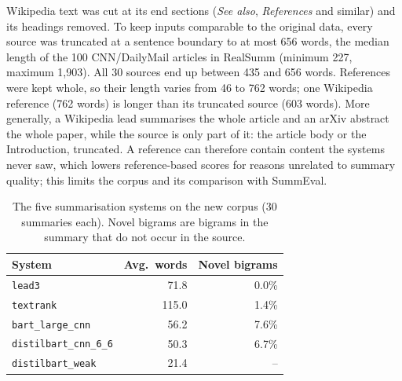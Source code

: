 \documentclass[11pt]{article}
\begin{document}
Wikipedia text was cut at its end sections (\emph{See also}, \emph{References} and similar) and its headings removed. To keep inputs comparable to the original data, every source was truncated at a sentence boundary to at most 656 words, the median length of the 100 CNN/DailyMail articles in RealSumm (minimum 227, maximum 1,903). All 30 sources end up between 435 and 656 words. References were kept whole, so their length varies from 46 to 762 words; one Wikipedia reference (762 words) is longer than its truncated source (603 words). More generally, a Wikipedia lead summarises the whole article and an arXiv abstract the whole paper, while the source is only part of it: the article body or the Introduction, truncated. A reference can therefore contain content the systems never saw, which lowers reference-based scores for reasons unrelated to summary quality; this limits the corpus and its comparison with SummEval.

\begin{table}[t]
\centering
\small
\begin{tabular}{@{}lrr@{}}
\toprule
System & Avg.\ words & Novel bigrams \\
\midrule
\texttt{lead3} & 71.8 & 0.0\% \\
\texttt{textrank} & 115.0 & 1.4\% \\
\texttt{bart\_large\_cnn} & 56.2 & 7.6\% \\
\texttt{distilbart\_cnn\_6\_6} & 50.3 & 6.7\% \\
\texttt{distilbart\_weak} & 21.4 & -- \\
\bottomrule
\end{tabular}
\caption{The five summarisation systems on the new corpus (30 summaries each). Novel bigrams are bigrams in the summary that do not occur in the source.}
\label{tab:systems}
\end{table}
\end{document}
